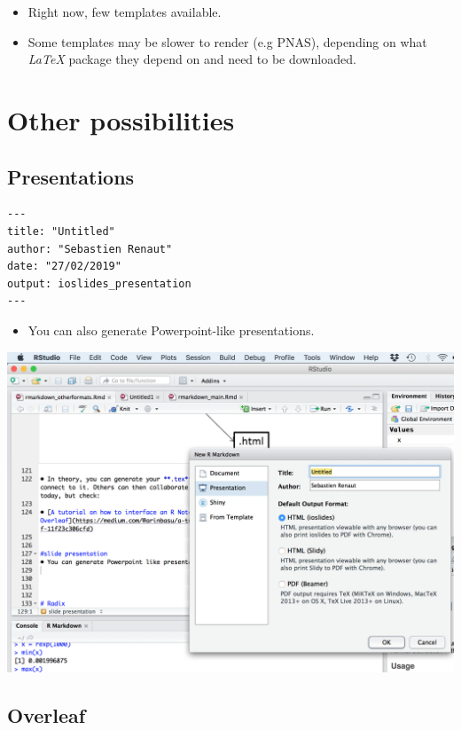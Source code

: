 \documentclass[]{article}
\providecommand{\tightlist}{%
  \setlength{\itemsep}{0pt}\setlength{\parskip}{0pt}}
\begin{document}
\begin{itemize}
\item
  Right now, few templates available.
\item
  Some templates may be slower to render (e.g PNAS), depending on what
  \emph{LaTeX} package they depend on and need to be downloaded.
\end{itemize}

\hypertarget{other-possibilities}{%
\section{Other possibilities}\label{other-possibilities}}

\hypertarget{presentations}{%
\subsection{Presentations}\label{presentations}}

\begin{verbatim}
---
title: "Untitled"
author: "Sebastien Renaut"
date: "27/02/2019"
output: ioslides_presentation
---
\end{verbatim}

\begin{itemize}
\tightlist
\item
  You can also generate Powerpoint-like presentations.
\end{itemize}

\includegraphics[width=7.29167in,height=\textheight]{../figures/slides.png}

\hypertarget{overleaf}{%
\subsection{Overleaf}\label{overleaf}}
\end{document}
